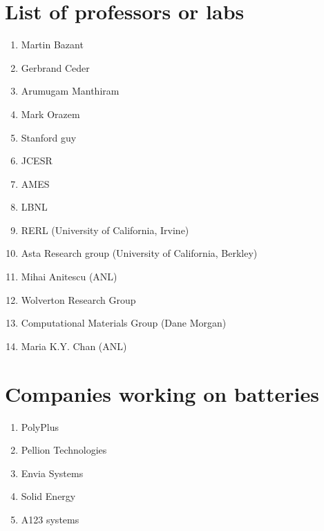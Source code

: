 \documentclass[12pt]{book}
\begin{document}
%

\newpage
\chapter{List of professors or labs}
\begin{enumerate}
\item Martin Bazant
\item Gerbrand Ceder
\item Arumugam Manthiram
\item Mark Orazem
\item Stanford guy
\item JCESR
\item AMES
\item LBNL
\item RERL (University of California, Irvine)
\item Asta Research group (University of California, Berkley)
\item Mihai Anitescu (ANL)
\item Wolverton Research Group
\item Computational Materials Group (Dane Morgan)
\item Maria K.Y. Chan (ANL)
\end{enumerate}

\newpage
\chapter{Companies working on batteries}
\begin{enumerate}
\item PolyPlus
\item Pellion Technologies
\item Envia Systems
\item Solid Energy
\item A123 systems
\end{enumerate}
\newpage 
\end{document}
